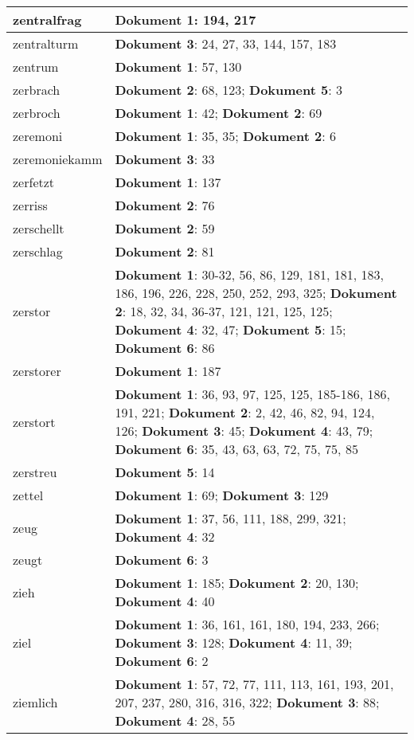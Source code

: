 \documentclass[a5paper]{article}
\begin{document}
\begin{longtable}[l]{|l|p{3in}|}
\hline
zentralfrag & \textbf{Dokument 1}: 194, 217 \\
\hline
zentralturm & \textbf{Dokument 3}: 24, 27, 33, 144, 157, 183 \\
\hline
zentrum & \textbf{Dokument 1}: 57, 130 \\
\hline
zerbrach & \textbf{Dokument 2}: 68, 123; \textbf{Dokument 5}: 3 \\
\hline
zerbroch & \textbf{Dokument 1}: 42; \textbf{Dokument 2}: 69 \\
\hline
zeremoni & \textbf{Dokument 1}: 35, 35; \textbf{Dokument 2}: 6 \\
\hline
zeremoniekamm & \textbf{Dokument 3}: 33 \\
\hline
zerfetzt & \textbf{Dokument 1}: 137 \\
\hline
zerriss & \textbf{Dokument 2}: 76 \\
\hline
zerschellt & \textbf{Dokument 2}: 59 \\
\hline
zerschlag & \textbf{Dokument 2}: 81 \\
\hline
zerstor & \textbf{Dokument 1}: 30-32, 56, 86, 129, 181, 181, 183, 186, 196, 226, 228, 250, 252, 293, 325; \textbf{Dokument 2}: 18, 32, 34, 36-37, 121, 121, 125, 125; \textbf{Dokument 4}: 32, 47; \textbf{Dokument 5}: 15; \textbf{Dokument 6}: 86 \\
\hline
zerstorer & \textbf{Dokument 1}: 187 \\
\hline
zerstort & \textbf{Dokument 1}: 36, 93, 97, 125, 125, 185-186, 186, 191, 221; \textbf{Dokument 2}: 2, 42, 46, 82, 94, 124, 126; \textbf{Dokument 3}: 45; \textbf{Dokument 4}: 43, 79; \textbf{Dokument 6}: 35, 43, 63, 63, 72, 75, 75, 85 \\
\hline
zerstreu & \textbf{Dokument 5}: 14 \\
\hline
zettel & \textbf{Dokument 1}: 69; \textbf{Dokument 3}: 129 \\
\hline
zeug & \textbf{Dokument 1}: 37, 56, 111, 188, 299, 321; \textbf{Dokument 4}: 32 \\
\hline
zeugt & \textbf{Dokument 6}: 3 \\
\hline
zieh & \textbf{Dokument 1}: 185; \textbf{Dokument 2}: 20, 130; \textbf{Dokument 4}: 40 \\
\hline
ziel & \textbf{Dokument 1}: 36, 161, 161, 180, 194, 233, 266; \textbf{Dokument 3}: 128; \textbf{Dokument 4}: 11, 39; \textbf{Dokument 6}: 2 \\
\hline
ziemlich & \textbf{Dokument 1}: 57, 72, 77, 111, 113, 161, 193, 201, 207, 237, 280, 316, 316, 322; \textbf{Dokument 3}: 88; \textbf{Dokument 4}: 28, 55 \\

\end{longtable}
\end{document}
